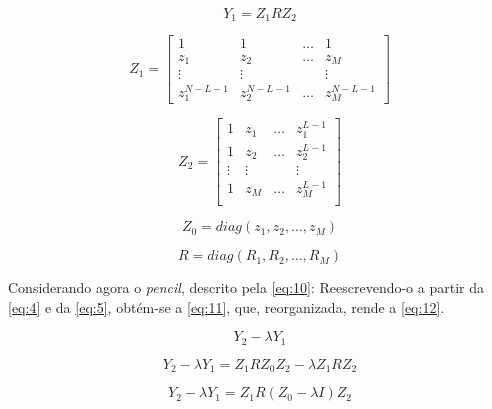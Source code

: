\documentclass[12pt]{article}
\begin{document}
\begin{equation} \label{eq:5}
    Y_1 = Z_1 R Z_2
\end{equation}

\begin{equation} \label{eq:6}
    Z_1 = \begin{bmatrix} 1 & 1 & \dots & 1 \\
                            z_1 & z_2 & \dots & z_M \\
                            \vdots & \vdots & & \vdots \\
                            z_1^{N - L - 1} & z_2^{N - L - 1} & \dots & z_M^{N - L - 1} 
    \end{bmatrix}  
\end{equation}

\begin{equation} \label{eq:7}
    Z_2 = \begin{bmatrix} 1 & z_1 & \dots & z_1^{L-1} \\
                            1 & z_2 & \dots & z_2^{L-1} \\
                            \vdots & \vdots & & \vdots \\
                            1 & z_M & \dots & z_M^{L-1} \\
    \end{bmatrix}
\end{equation}

\begin{equation} \label{eq:8}
    Z_0 = diag(z_1, z_2, \dots, z_M)
\end{equation}

\begin{equation} \label{eq:9}
    R = diag(R_1, R_2, \dots, R_M)
\end{equation}

Considerando agora o \textit{pencil}, descrito pela \autoref{eq:10}: Reescrevendo-o a partir da \autoref{eq:4} e da \autoref{eq:5}, obtém-se a \autoref{eq:11}, que, reorganizada, 
rende a \autoref{eq:12}.

\begin{equation} \label{eq:10}
    Y_2 - \lambda Y_1
\end{equation}

\begin{equation} \label{eq:11}
    Y_2 - \lambda Y_1 = Z_1 R Z_0 Z_2 - \lambda Z_1 R Z_2
\end{equation}

\begin{equation} \label{eq:12}
    Y_2 - \lambda Y_1 = Z_1 R (Z_0 - \lambda I) Z_2
\end{equation}
\end{document}
